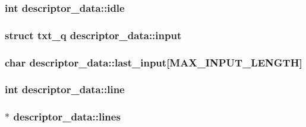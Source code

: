 \hypertarget{structdescriptor__data_a7971ed70eebcdfda90f3233a3352a26f}{
\subsubsection[{idle}]{\setlength{\rightskip}{0pt plus 5cm}int descriptor\-\_\-data\-::idle}}\label{structdescriptor__data_a7971ed70eebcdfda90f3233a3352a26f}
\hypertarget{structdescriptor__data_adf1841a384f10c280b716dcc40d40253}{
\subsubsection[{input}]{\setlength{\rightskip}{0pt plus 5cm}struct {\bf txt\-\_\-q} descriptor\-\_\-data\-::input}}\label{structdescriptor__data_adf1841a384f10c280b716dcc40d40253}
\hypertarget{structdescriptor__data_a63e2efd58dfbf6ff566f87ed43ce4ea7}{
\subsubsection[{last\-\_\-input}]{\setlength{\rightskip}{0pt plus 5cm}char descriptor\-\_\-data\-::last\-\_\-input\mbox{[}{\bf M\-A\-X\-\_\-\-I\-N\-P\-U\-T\-\_\-\-L\-E\-N\-G\-T\-H}\mbox{]}}}\label{structdescriptor__data_a63e2efd58dfbf6ff566f87ed43ce4ea7}
\hypertarget{structdescriptor__data_a1477839877221460a132848b7340f904}{
\subsubsection[{line}]{\setlength{\rightskip}{0pt plus 5cm}int descriptor\-\_\-data\-::line}}\label{structdescriptor__data_a1477839877221460a132848b7340f904}
\hypertarget{structdescriptor__data_acbeac2151507e9008f0dc4b4f4acb6ad}{
\subsubsection[{lines}]{$\ast$ descriptor\-\_\-data\-::lines}}\label{structdescriptor__data_acbeac2151507e9008f0dc4b4f4acb6ad}
